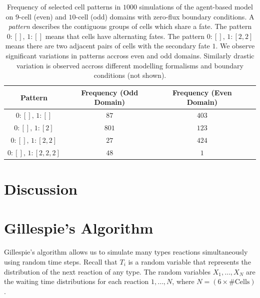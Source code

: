 \documentclass{article}
\begin{document}
\begin{flushleft}
\begin{table}[!htp]
\centering
\begin{tabular}{|c|c|c|c|} 
 \hline
 Pattern & Frequency (Odd Domain) & Frequency (Even Domain)  \\
 \hline
 $0: [], \, 1: []$ & $87$ & $403$ \\
 $0: [], \, 1: [2]$ & $801$ & $123$ \\
 $0: [], \, 1: [2, 2]$ & $27$ & $424$ \\
 $0: [], \, 1: [2, 2, 2]$ & $48$ & $1$ \\
 \hline
\end{tabular}
\caption{
  Frequency of selected cell patterns in $1000$ simulations of the agent-based model on $9$-cell (even) and $10$-cell (odd) domains with zero-flux boundary conditions. A \emph{pattern} describes the contiguous groups of cells which share a fate. The pattern $0: [], \, 1: []$ means that cells have alternating fates. The pattern $0: [], \, 1: [2, 2]$ means there are two adjacent pairs of cells with the secondary fate $1$. We observe significant variations in patterns accross even and odd domains. Similarly drastic variation is observed accross different modelling formalisms and boundary conditions (not shown).
}
\label{tb:patterns}
\end{table}


\section*{Discussion}


\nocite{*}
\printbibliography

\appendix

\section{Gillespie's Algorithm} \label{sec:gillespie}

Gillespie's algorithm allows us to simulate many types reactions simultaneously using random time steps. Recall that $T_{i}$ is a random variable that represents the distribution of the next reaction of any type. The random variables $X_{1}, \dots, X_{N}$ are the waiting time distributions for each reaction $1, \dots, N$, where $N = (6 \times \text{\# Cells})$.

\medskip


\end{flushleft}
\end{document}
